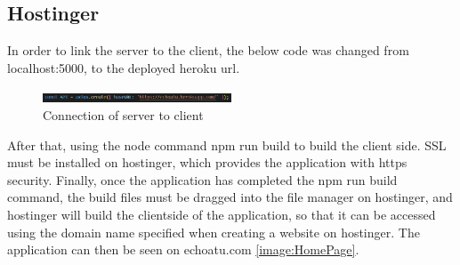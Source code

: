 \subsection{Hostinger}
In order to link the server to the client, the below code was changed from localhost:5000, to the deployed heroku url.
\begin{figure}[h!]
    \centering
    \includegraphics[width=0.5\textwidth]{images/herokuDeploy.png}
    \caption{Connection of server to client}
    \label{image:herokuDeploy}
\end{figure}
After that, using the node command npm run build to build the client side. SSL \cite{hickman1995ssl} must be installed on hostinger, which provides the application with https security. Finally, once the application has completed the npm run build command, the build files must be dragged into the file manager on hostinger, and hostinger will build the clientside of the application, so that it can be accessed using the domain name specified when creating a website on hostinger. The application can then be seen on echoatu.com \ref{image:HomePage}.